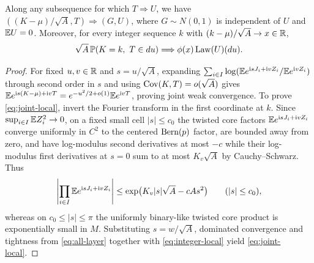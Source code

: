 \begin{lemma}\label{lem:joint-local}
Along any subsequence for which $T\Rightarrow U$, we have
$((K-\mu)/\sqrt A,T)\Rightarrow(G,U)$, where $G\sim N(0,1)$ is independent
of $U$ and $\mathbb E U=0$. Moreover, for every integer sequence $k$ with
$(k-\mu)/\sqrt A\to x\in\mathbb R$,
\begin{equation}\label{eq:joint-local}
        \sqrt A\,\mathbb P(K=k,\ T\in du)\Longrightarrow\phi(x)\operatorname{Law}(U)(du).
\end{equation}
\end{lemma}
\begin{proof}
For fixed $u,v\in\mathbb R$ and $s=u/\sqrt A$, expanding
$\sum_{i\in I}\log(\mathbb E e^{\mathrm i sJ_i+\mathrm i vZ_i}/\mathbb E e^{\mathrm i vZ_i})$ through second
order in $s$ and using $\operatorname{Cov}(K,T)=o(\sqrt A)$ gives
$\mathbb E e^{\mathrm i s(K-\mu)+\mathrm i vT}=e^{-u^2/2+o(1)}\mathbb E e^{\mathrm i vT}$, proving joint
weak convergence. To prove \eqref{eq:joint-local}, invert the Fourier
transform in the first coordinate at $k$. Since $\sup_{i\in I}\mathbb E Z_i^2\to0$,
on a fixed small cell $|s|\le c_0$ the twisted core factors
$\mathbb E e^{\mathrm i sJ_i+\mathrm i vZ_i}$ converge uniformly in $C^2$ to the centered
$\operatorname{Bern}(p)$ factor, are bounded away from zero, and have log-modulus second
derivatives at most $-c$ while their log-modulus first derivatives at $s=0$
sum to at most $K_v\sqrt A$ by Cauchy--Schwarz. Thus
\[
 \left|\prod_{i\in I}\mathbb E e^{\mathrm i sJ_i+\mathrm i vZ_i}\right|
          \le\exp\bigl(K_v|s|\sqrt A-cAs^2\bigr)\qquad(|s|\le c_0),
\]
whereas on $c_0\le|s|\le\pi$ the uniformly binary-like twisted core product is
exponentially small in $M$. Substituting $s=w/\sqrt A$, dominated convergence
and tightness from \eqref{eq:all-layer} together with \eqref{eq:integer-local}
yield \eqref{eq:joint-local}.
\end{proof}

